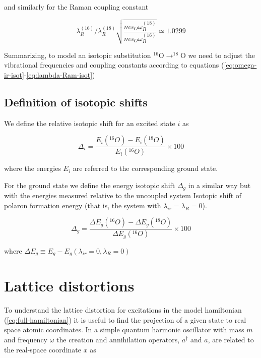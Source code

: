 \noindent and similarly for the Raman coupling constant

\begin{equation}
  \label{eq:lambda-Ram-isot}
  \lambda_R^{(16)} / \lambda_R^{(18)} \sqrt{\frac{m_{^{18}O}\omega_{R}^{(18)}}{m_{^{16}O}\omega_{R}^{(16)}}} \simeq 1.0299
\end{equation}

Summarizing, to model an isotopic substitution $^{16}$O$\rightarrow ^{18}$O we need to adjust the vibrational frequencies and coupling constants according to equations (\ref{eq:omega-ir-isot}-\ref{eq:lambda-Ram-isot})

\subsection{Definition of isotopic shifts}


We define the relative isotopic shift for an excited state $i$ as 

\begin{equation}
  \label{eq:isot-shift-def-exc}
  \Delta_i = \frac{E_i(^{16}O)- E_i(^{18}O)}{E_i(^{16}O)} \times 100
\end{equation}

where the energies $E_i$ are referred to the corresponding ground state.

For the ground state we define the energy isotopic shift $\Delta_g$ in a similar way but with the energies measured relative to the uncoupled system Isotopic shift of polaron formation energy (that is, the system with $\lambda_{ir}=\lambda_R=0$).

\begin{equation}
  \label{eq:isot-shift-def-grd}
  \Delta_g = \frac{\Delta E_g(^{16}O)- \Delta E_g(^{18}O)}{\Delta E_g(^{16}O)} \times 100
\end{equation}

where $\Delta E_g \equiv E_g - E_g(\lambda_{ir}=0, \lambda_R=0)$

\section{Lattice distortions}
\label{sec:lattice-distortions}

To understand the lattice distortion for excitations in the model hamiltonian (\ref{eq:full-hamiltonian}) it is useful to find the projection of a given state to real space atomic coordinates. 
In a simple quantum harmonic oscillator with mass $m$ and frequency $\omega$ the creation and annihilation operators, $a^\dagger$ and $a$, are related to the real-space coordinate $x$ as

